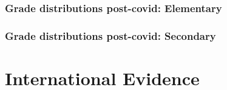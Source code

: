 \documentclass{beamer}
\begin{document}
\begin{frame}
    \label{update_scott}
    \frametitle{Grade distributions post-covid: Elementary}
 {
    }
\end{frame}

\begin{frame}
    \label{update_scott}
    \frametitle{Grade distributions post-covid: Secondary}
 {
    }
\end{frame}


\section{International Evidence}
\end{document}
